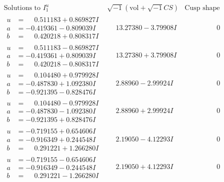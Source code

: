 \documentclass[1p]{elsarticle_modified}
\theoremstyle{definition}
\newcommand{\I}{\sqrt{-1}}
\begin{document}
$$\begin{array}{c|c|c}  
\text{Solutions to }I^u_{1}& \I (\text{vol} + \sqrt{-1}CS) & \text{Cusp shape}\\
 \hline 
\begin{aligned}
u &= \phantom{-}0.511183 + 0.869827 I \\
a &= -0.419361 - 0.809039 I \\
b &= \phantom{-}0.420218 + 0.808317 I\end{aligned}
 & \phantom{-}13.27380 - 3.79908 I & \phantom{-0.000000 } 0 \\ \hline\begin{aligned}
u &= \phantom{-}0.511183 - 0.869827 I \\
a &= -0.419361 + 0.809039 I \\
b &= \phantom{-}0.420218 - 0.808317 I\end{aligned}
 & \phantom{-}13.27380 + 3.79908 I & \phantom{-0.000000 } 0 \\ \hline\begin{aligned}
u &= \phantom{-}0.104480 + 0.979928 I \\
a &= -0.487830 + 1.092380 I \\
b &= -0.921395 - 0.828476 I\end{aligned}
 & \phantom{-}2.88960 - 2.99924 I & \phantom{-0.000000 } 0 \\ \hline\begin{aligned}
u &= \phantom{-}0.104480 - 0.979928 I \\
a &= -0.487830 - 1.092380 I \\
b &= -0.921395 + 0.828476 I\end{aligned}
 & \phantom{-}2.88960 + 2.99924 I & \phantom{-0.000000 } 0 \\ \hline\begin{aligned}
u &= -0.719155 + 0.654606 I \\
a &= -0.916349 + 0.244548 I \\
b &= \phantom{-}0.291221 + 1.266280 I\end{aligned}
 & \phantom{-}2.19050 - 4.12293 I & \phantom{-0.000000 } 0 \\ \hline\begin{aligned}
u &= -0.719155 - 0.654606 I \\
a &= -0.916349 - 0.244548 I \\
b &= \phantom{-}0.291221 - 1.266280 I\end{aligned}
 & \phantom{-}2.19050 + 4.12293 I & \phantom{-0.000000 } 0 \\ \hline\begin{aligned}

\end{aligned}
\end{array}$$
\end{document}

